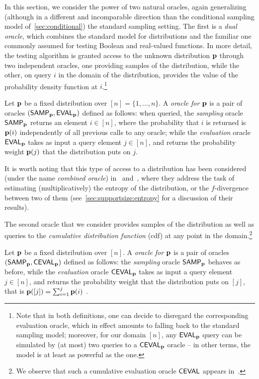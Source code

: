   In this section, we consider the power of two natural oracles, again generalizing (although in a different and incomparable direction than the conditional sampling model of~\cref{sec:conditional}) the standard sampling setting. The first is a \emph{dual oracle}, which combines the standard model for distributions and the familiar one commonly assumed for testing Boolean and real-valued functions. In more detail, the testing algorithm is granted access to the unknown distribution $\mathbf{p}$ through two independent oracles, one providing samples of the distribution, while the other, on query $i$ in the domain of the distribution, provides the value of the probability
density function at $i$.\footnote{Note that in both definitions, one can decide to disregard the corresponding evaluation oracle, which in effect amounts to falling back to the standard sampling model; moreover, for our domain $[n]$, any ${\sf EVAL}_{\mathbf{p}}$ query can be simulated by (at most) two queries to a ${\sf CEVAL}_{\mathbf{p}}$ oracle -- in other terms, the \cdfsamp model is at least as powerful as the \pdfsamp one.}
    
    \begin{definition}
    Let $\mathbf{p}$ be a fixed distribution over $[n]=\{1,\dots,n\}$. A \emph{\pdfsamp oracle for $\mathbf{p}$} is a pair of oracles $({\sf SAMP}_{\mathbf{p}}, {\sf EVAL}_{\mathbf{p}})$ defined as follows: when queried, the \emph{sampling} oracle ${\sf SAMP}_{\mathbf{p}}$ returns an element $i\in[n]$, where the probability that $i$ is returned is $\mathbf{p}(i)$ independently of all previous calls to any oracle; while the \emph{evaluation} oracle ${\sf EVAL}_{\mathbf{p}}$ takes as input a query element $j\in[n]$, and returns the probability weight $\mathbf{p}(j)$ that the distribution puts on $j$.
    \end{definition}
    It is worth noting that this type of \pdfsamp access to a distribution has been considered (under the name \emph{combined oracle}) in~\cite{BDKR:05} and~\cite{GMV:06}, where they address the task of estimating (multiplicatively) the entropy of the distribution, or the $f$-divergence between two of them (see~\cref{sec:supportsize:entropy} for a discussion of their results).\medskip
    
    The second oracle that we consider provides samples of the distribution as well as queries to the \emph{cumulative distribution function} (cdf) at any point in the domain.\footnote{We observe that such a cumulative evaluation oracle ${\sf CEVAL}$ appears in~\cite[Section 8]{BKR:04}.}
    \begin{definition}
    Let $\mathbf{p}$ be a fixed distribution over $[n]$. A \emph{\cdfsamp oracle for $\mathbf{p}$} is a pair of oracles $({\sf SAMP}_{\mathbf{p}}, {\sf CEVAL}_{\mathbf{p}})$ defined as follows: the \emph{sampling} oracle ${\sf SAMP}_{\mathbf{p}}$ behaves as before, while the \emph{evaluation} oracle ${\sf CEVAL}_{\mathbf{p}}$ takes as input a query element $j\in[n]$, and returns the probability weight that the distribution puts on $[j]$, that is
    $\mathbf{p}([j])=\sum_{i=1}^j \mathbf{p}(i)$ .
    \end{definition}    
    
